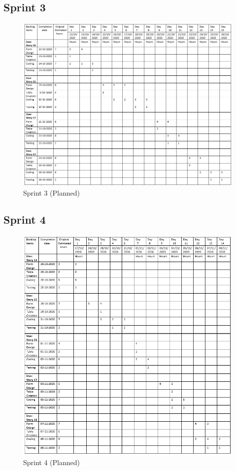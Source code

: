 \documentclass[a4paper,12pt]{report}
\begin{document}
\subsection {Sprint 3}
\begin{figure}[bph]
	\centering
	\includegraphics[width=1\linewidth]{img/sprint/sp3p}
	\caption{Sprint 3 (Planned)}
\end{figure}
\pagebreak
\subsection {Sprint 4}
\begin{figure}[bph]
	\centering
	\includegraphics[width=0.9\linewidth]{img/sprint/sp4p}
	\caption{Sprint 4 (Planned)}
\end{figure}
\pagebreak
\end{document}
